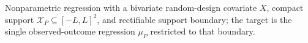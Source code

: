 Nonparametric regression with a bivariate random-design covariate \(X\), compact support \(\mathcal X_P\subseteq[-L,L]^2\), and rectifiable support boundary; the target is the single observed-outcome regression \(\mu_P\) restricted to that boundary.